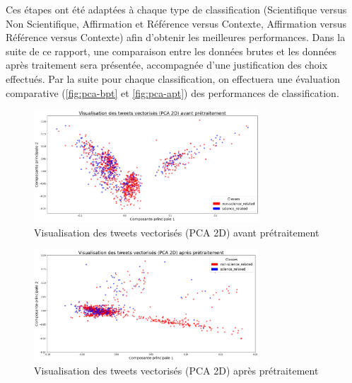 Ces étapes ont été adaptées à chaque type de classification (Scientifique versus Non Scientifique, Affirmation et Référence versus Contexte, Affirmation versus Référence versus Contexte) afin d’obtenir les meilleures performances.
Dans la suite de ce rapport, une comparaison entre les données brutes et les données après traitement sera présentée, accompagnée d’une justification des choix effectués.
Par la suite pour chaque classification, on effectuera une évaluation comparative (\autoref{fig:pca-bpt} et \autoref{fig:pca-apt}) des performances de classification.

\begin{figure}[H]
    \centering
    \includegraphics[width=0.75\textwidth]{images/PCA-BPT}
    \caption{Visualisation des tweets vectorisés (PCA 2D) avant prétraitement}
    \label{fig:pca-bpt}
\end{figure}

\begin{figure}[H]
    \centering
    \includegraphics[width=0.75\textwidth]{images/PCA-APT}
    \caption{Visualisation des tweets vectorisés (PCA 2D) après prétraitement}
    \label{fig:pca-apt}
\end{figure}